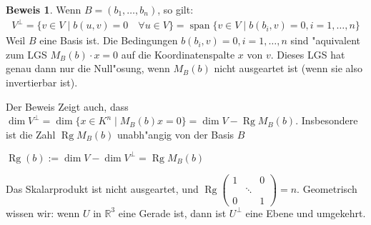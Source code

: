 \documentclass[oneside,fontsize=11pt,paper=a4,BCOR=0mm,DIV=12,automark,headsepline]{scrbook}
\DeclareMathOperator{\mRg}{Rg}
\DeclareMathOperator{\spn}{span}
\theoremstyle{remark}
\theoremstyle{definition}
\theoremstyle{definition}
\newtheorem*{prof}{Beweis}
\theoremstyle{remark}
\begin{document}
\begin{prof}
  Wenn \(B = (b_1, \dots, b_n)\), so gilt:
  \begin{align*}
    V^\perp = \{v \in V \mid b(u, v) = 0\quad \forall u \in V\} = \spn \{ v\in V \mid b(b_i, v) = 0, i = 1,\dots, n\}
  \end{align*}
  Weil \(B\) eine Basis ist.
  Die Bedingungen \(b(b_i, v) = 0, i = 1,\dots, n\) sind "aquivalent zum LGS $M_B(b) \cdot x = 0 $  auf die
  Koordinatenspalte $x$ von $v$. Dieses LGS hat genau dann nur die Null"osung,
  wenn $M_B(b)$ nicht ausgeartet ist (wenn sie also invertierbar ist).
\end{prof}
Der Beweis Zeigt auch, dass $\dim V^\perp = \dim
  \{x\in K^n\mid  M_B(b)x= 0\} = \dim V - \mRg M_B(b)$. Insbesondere ist die Zahl $\mRg M_B(b)$
  unabh"angig von der Basis $B$
\begin{definition}{}{}
  \(\mRg(b):=\dim V - \dim V^\perp = \mRg M_B(b)\)
\end{definition}

\begin{exa}
  Das Skalarprodukt ist nicht ausgeartet, und \(\mRg
  \begin{pmatrix}
    1 & & 0 \\
    & \ddots & \\
    0 & & 1
  \end{pmatrix}
 = n\). Geometrisch wissen wir: wenn $U$ in
  $\mathbb{R}^3$ eine Gerade ist, dann ist \(U^\perp\) eine Ebene und umgekehrt.
\end{exa}
\end{document}
